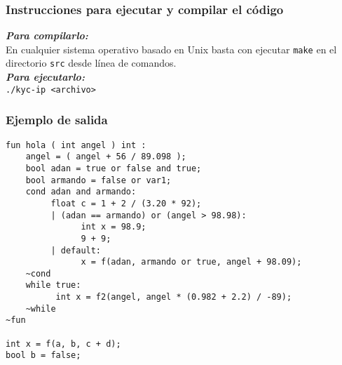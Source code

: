 \documentclass[12pt]{article}
\begin{document}
\subsubsection*{Instrucciones para ejecutar y compilar el código}

\textbf{\textit{Para compilarlo:}}\\

En cualquier sistema operativo basado en Unix basta con ejecutar \texttt{make} en el directorio \texttt{src} desde línea de comandos. \\

\textbf{\textit{Para ejecutarlo:}} \\

\texttt{./kyc-ip <archivo>}
\subsubsection*{Ejemplo de salida}
\begin{verbatim}
fun hola ( int angel ) int : 
    angel = ( angel + 56 / 89.098 );
    bool adan = true or false and true;
    bool armando = false or var1;
    cond adan and armando:
         float c = 1 + 2 / (3.20 * 92);
         | (adan == armando) or (angel > 98.98):
               int x = 98.9;
               9 + 9;
         | default:
               x = f(adan, armando or true, angel + 98.09);            
    ~cond
    while true:
          int x = f2(angel, angel * (0.982 + 2.2) / -89);            
    ~while
~fun

int x = f(a, b, c + d);
bool b = false;
\end{verbatim}
\end{document}
